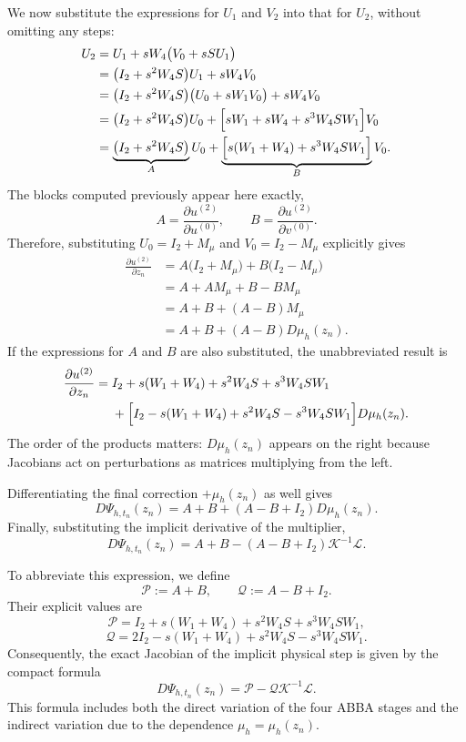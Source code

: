 \documentclass[11pt,a4paper]{article}
\newcommand{\Id}{I}
\begin{document}
We now substitute the expressions for $U_1$ and $V_2$ into that for $U_2$, without omitting
any steps:
\begin{align*}
 U_2
 &=U_1+sW_4\bigl(V_0+sS U_1\bigr)\\
 &=\bigl(\Id_2+s^2W_4S\bigr)U_1+sW_4V_0\\
 &=\bigl(\Id_2+s^2W_4S\bigr)
   \bigl(U_0+sW_1V_0\bigr)+sW_4V_0\\
 &=\bigl(\Id_2+s^2W_4S\bigr)U_0
   +\Bigl[sW_1+sW_4+s^3W_4SW_1\Bigr]V_0\\
 &=\underbrace{\bigl(\Id_2+s^2W_4S\bigr)}_{A}U_0
   +\underbrace{\Bigl[s(W_1+W_4)+s^3W_4SW_1\Bigr]}_{B}V_0.
\end{align*}
The blocks computed previously appear here exactly,
\[
 A=\frac{\partial u^{(2)}}{\partial u^{(0)}},
 \qquad
 B=\frac{\partial u^{(2)}}{\partial v^{(0)}}.
\]
Therefore, substituting $U_0=\Id_2+M_\mu$ and $V_0=\Id_2-M_\mu$ explicitly gives
\begin{align*}
 \frac{\partial u^{(2)}}{\partial z_n}
 &=A\bigl(\Id_2+M_\mu\bigr)
   +B\bigl(\Id_2-M_\mu\bigr)\\
 &=A+AM_\mu+B-BM_\mu\\
 &=A+B+(A-B)M_\mu\\
 &=A+B+(A-B)D\mu_h(z_n).
\end{align*}
If the expressions for $A$ and $B$ are also substituted, the unabbreviated result is
\begin{align*}
 \frac{\partial u^{(2)}}{\partial z_n}
 ={}&\Id_2+s(W_1+W_4)+s^2W_4S+s^3W_4SW_1\\
 &+\Bigl[
 \Id_2-s(W_1+W_4)+s^2W_4S-s^3W_4SW_1
 \Bigr]D\mu_h(z_n).
\end{align*}
The order of the products matters: $D\mu_h(z_n)$ appears on the right because Jacobians
act on perturbations as matrices multiplying from the left.

Differentiating the final correction $+\mu_h(z_n)$ as well gives
\[
 \boxed{
 D\Psi_{h,t_n}(z_n)
 =A+B+(A-B+\Id_2)D\mu_h(z_n).
 }
\]
Finally, substituting the implicit derivative of the multiplier,
\[
 \boxed{
 D\Psi_{h,t_n}(z_n)
 =A+B-(A-B+\Id_2)\mathcal K^{-1}\mathcal L.
 }
\]

To abbreviate this expression, we define
\[
 \mathcal P:=A+B,
 \qquad
 \mathcal Q:=A-B+\Id_2.
\]
Their explicit values are
\[
 \boxed{
 \mathcal P
 =\Id_2+s(W_1+W_4)+s^2W_4S+s^3W_4SW_1,
 }
\]
\[
 \boxed{
 \mathcal Q
 =2\Id_2-s(W_1+W_4)+s^2W_4S-s^3W_4SW_1.
 }
\]
Consequently, the exact Jacobian of the implicit physical step is given by the compact formula
\[
 \boxed{
 D\Psi_{h,t_n}(z_n)
 =\mathcal P-\mathcal Q\mathcal K^{-1}\mathcal L.
 }
\]
This formula includes both the direct variation of the four ABBA stages and the indirect
variation due to the dependence $\mu_h=\mu_h(z_n)$.
\end{document}
